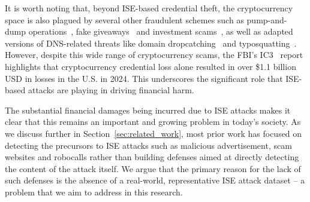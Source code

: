 It is worth noting that, beyond ISE-based credential theft, the cryptocurrency space is also plagued by several other fraudulent schemes such as pump-and-dump operations~\cite{XuL19}, fake giveaways~\cite{LiLG23,0001KMISTTVM24,LiYN23} and investment scams~\cite{SiuH23,SiuHV022,VasekM15}, as well as adapted versions of DNS-related threats like domain dropcatching~\cite{MuzammilWBN24} and typosquatting~\cite{MuzammilWHKN24}. However, despite this wide range of cryptocurrency scams, the FBI's IC3~\cite{ic3_report_24} report highlights that cryptocurrency credential loss alone resulted in over \$1.1 billion USD in losses in the U.S. in 2024. This underscores the significant role that ISE-based attacks are playing in driving financial harm.





The substantial financial damages being incurred due to ISE attacks makes it clear that this remains an important and growing problem in today's society. As we discuss further in Section~\ref{sec:related_work}, most prior work has focused on detecting the precursors to ISE attacks such as malicious advertisement, scam websites and robocalls rather than building defenses aimed at directly detecting the content of the attack itself. We argue that the primary reason for the lack of such defenses is the absence of a real-world, representative ISE attack dataset -- a problem that we aim to address in this research. 


